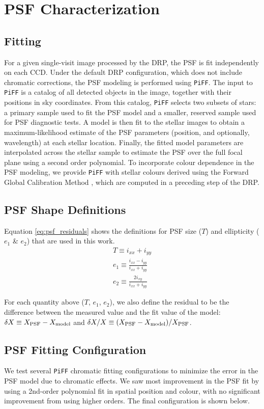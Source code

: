 \section{PSF Characterization}
\subsection{Fitting}
For a given single-visit image processed by the DRP, the PSF is fit independently on each CCD. 
Under the default DRP configuration, which does not include chromatic corrections, the PSF 
modeling is performed using \texttt{PiFF}. The input to \texttt{PiFF} is a catalog of all 
detected objects in the image, together with their positions in sky coordinates. From this 
catalog, \texttt{PiFF} selects two subsets of stars: a primary sample used to fit the PSF 
model and a smaller, reserved sample used for PSF diagnostic tests. A model is then fit to the stellar images to obtain a maximum-likelihood 
estimate of the PSF parameters (position, and optionally, wavelength) at each stellar location. Finally, the fitted model parameters are interpolated across 
the stellar sample to estimate the PSF over the full focal plane using a second order polynomial. To incorporate colour 
dependence in the PSF modeling, we provide \texttt{PiFF} with stellar colours derived using the 
Forward Global Calibration Method \citep[FGCM;][]{burke2017}, which are computed in a preceding 
step of the DRP.

\subsection{PSF Shape Definitions}
Equation \ref{eq:psf_residuals} shows the definitions for PSF size ($T$) and ellipticity ($e_1$ \& $e_2$) that are used in this work.
\begin{equation}
\label{eq:psf_residuals}
    \begin{aligned}
        T \equiv i_{xx} + i_{yy}  \\
        e_1 \equiv \frac{i_{xx}-i_{yy}}{i_{xx}+i_{yy}}\\
        e_2 \equiv \frac{2i_{xy}}{i_{xx}+i_{yy}}
    \end{aligned}
\end{equation}

For each quantity above ($T$, $e_1$, $e_2$), we also define the residual to be the difference between the measured value and the fit value of the model: $\delta X \equiv X_{\rm PSF} - X_{\rm model}$ and $\delta X/X \equiv (X_{\rm PSF}-X_{\rm model})/X_{\rm PSF}$.

\subsection{PSF Fitting Configuration}
We test several \texttt{PiFF} chromatic fitting configurations to minimize the error in the PSF model due to chromatic effects. 
We saw most improvement in the PSF fit by using a 2nd-order polynomial fit in spatial position and colour, with no significant improvement from using higher orders. 
The final configuration is shown below.
